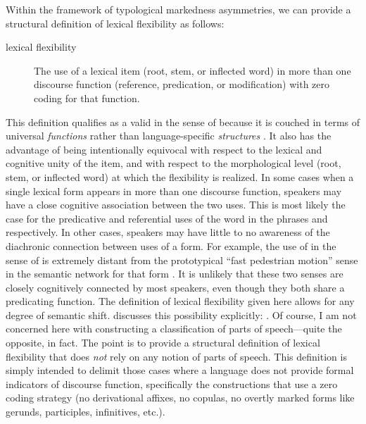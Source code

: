 Within the framework of typological markedness asymmetries, we can provide a structural definition of lexical flexibility as follows:

\begin{description}
  \item[lexical flexibility] The use of a lexical item (root, stem, or inflected word) in more than one discourse function (reference, predication, or modification) with zero coding for that function.
\end{description}

\noindent This definition qualifies as a valid  in the sense of \textcite{Haspelmath2010a} because it is couched in terms of universal \emph{functions} rather than language-specific \emph{structures} \parencite{Croft2016}. It also has the advantage of being intentionally equivocal with respect to the lexical and cognitive unity of the item, and with respect to the morphological level (root, stem, or inflected word) at which the flexibility is realized. In some cases when a single lexical form appears in more than one discourse function, speakers may have a close cognitive association between the two uses. This is most likely the case for the predicative and referential uses of the word  in the phrases  and  respectively. In other cases, speakers may have little to no awareness of the diachronic connection between uses of a form. For example, the use of  in the sense of  is extremely distant from the prototypical \enquote{fast pedestrian motion} sense in the semantic network for that form . It is unlikely that these two senses are closely cognitively connected by most speakers, even though they both share a predicating function. The definition of lexical flexibility given here allows for any degree of semantic shift. \citeauthor{Croft2001b} discusses this possibility explicitly: . Of course, I am not concerned here with constructing a classification of parts of speech—quite the opposite, in fact. The point is to provide a structural definition of lexical flexibility that does \emph{not} rely on any notion of parts of speech. This definition is simply intended to delimit those cases where a language does not provide formal indicators of discourse function, specifically the constructions that use a zero coding strategy (no derivational affixes, no copulas, no overtly marked forms like gerunds, participles, infinitives, etc.).

